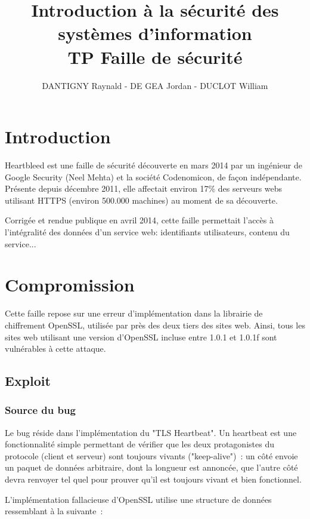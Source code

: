\documentclass[a4paper,oneside,1pt]{article}
\title{\Huge{Introduction à la sécurité des systèmes d'information}\\
TP Faille de sécurité}
\author{DANTIGNY Raynald - DE GEA Jordan - DUCLOT William}
\begin{document}
\maketitle

\section{Introduction}
Heartbleed est une faille de sécurité découverte en mars 2014 par un ingénieur de Google Security (Neel Mehta) et la société Codenomicon, de façon indépendante. Présente depuis décembre 2011, elle affectait environ 17\% des serveurs webs utilisant HTTPS (environ 500.000 machines) au moment de sa découverte.

Corrigée et rendue publique en avril 2014, cette faille permettait l'accès à l'intégralité des données d'un service web: identifiants utilisateurs, contenu du service...

\section{Compromission}
Cette faille repose sur une erreur d'implémentation dans la librairie de chiffrement OpenSSL, utilisée par près des deux tiers des sites web. Ainsi, tous les sites web utilisant une version d'OpenSSL incluse entre 1.0.1 et 1.0.1f sont vulnérables à cette attaque.

\subsection{Exploit}
\subsubsection{Source du bug}
Le bug réside dans l'implémentation du "TLS Heartbeat". Un heartbeat est une fonctionnalité simple permettant de vérifier que les deux protagonistes du protocole (client et serveur) sont toujours vivants ("keep-alive")~: un côté envoie un paquet de données arbitraire, dont la longueur est annoncée, que l'autre côté devra renvoyer tel quel pour prouver qu'il est toujours vivant et bien fonctionnel.

L'implémentation fallacieuse d'OpenSSL utilise une structure de données ressemblant à la suivante~:
\end{document}
